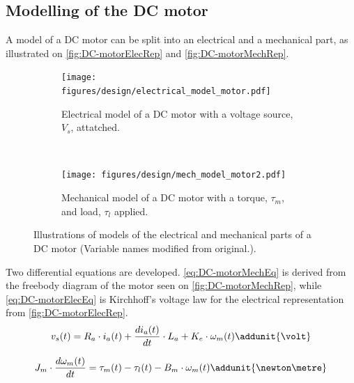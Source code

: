 \subsection{Modelling of the DC motor}\label{sec:DC-motorTechnicalKnowledge}
A model of a DC motor can be split into an electrical and a mechanical part, as illustrated on \autoref{fig:DC-motorElecRep} and \autoref{fig:DC-motorMechRep}. 
\begin{figure}[h!]
    \centering
    \begin{subfigure}[b]{0.45\textwidth}
        \texttt{[image: figures/design/electrical\_model\_motor.pdf]}
		\caption{Electrical model of a DC motor with a voltage source, $V_s$, attatched.}
		\label{fig:DC-motorElecRep}
    \end{subfigure}
    ~ 
    \begin{subfigure}[b]{0.45\textwidth}
       \texttt{[image: figures/design/mech\_model\_motor2.pdf]}
		\caption{Mechanical model of a DC motor with a torque, $\tau_m$, and load, $\tau_l$ applied.}
		\label{fig:DC-motorMechRep}
    \end{subfigure}
    \caption{Illustrations of models of the electrical and mechanical parts of a DC motor \citep{ModelingAndAnalisys} (Variable names modified from original.).}\label{fig:DCMotorModel}
\end{figure}

Two differential equations are developed.  \autoref{eq:DC-motorMechEq} is derived from the freebody diagram of the motor seen on \autoref{fig:DC-motorMechRep}, while \autoref{eq:DC-motorElecEq} is Kirchhoff's voltage law for the electrical representation from \autoref{fig:DC-motorElecRep}. 
\begin{equation} 
v_{s}(t) = R_{a}\cdot i_a(t) + \frac{d i_a(t)}{d t}\cdot L_a + K_{e}\cdot\omega_{m}(t) \addunit{\volt} \label{eq:DC-motorElecEq}
\end{equation}
\startexplain
{}
\stopexplain

\clearpage
\begin{equation}
J_m \cdot \frac{d \omega_{m}(t)}{d t} = \tau_{m}(t) - \tau_{l}(t) - B_m \cdot \omega_{m}(t) \addunit{\newton\metre}  \label{eq:DC-motorMechEq}
\end{equation}
\startexplain
{}
\stopexplain

